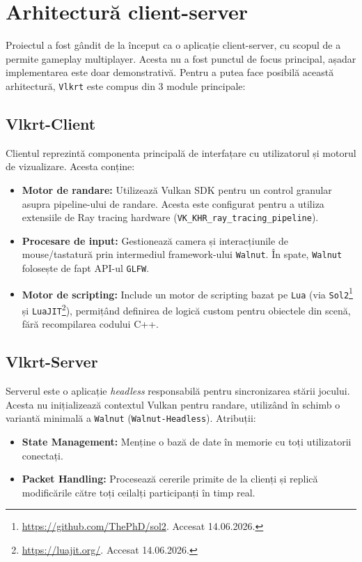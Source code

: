 \documentclass[12pt,a4paper]{report}
\numberwithin{equation}{section} %
\begin{document}
\section{Arhitectură client-server}

Proiectul a fost gândit de la început ca o aplicație client-server, cu scopul de a permite gameplay multiplayer.
Acesta nu a fost punctul de focus principal, așadar implementarea este doar demonstrativă.
Pentru a putea face posibilă această arhitectură, \texttt{Vlkrt} este compus din 3 module principale:

\subsection{Vlkrt-Client}

Clientul reprezintă componenta principală de interfațare cu utilizatorul și motorul de vizualizare.
Acesta conține:
\begin{itemize}
    \item \textbf{Motor de randare:} Utilizează Vulkan SDK pentru un control granular asupra pipeline-ului de randare.
        Acesta este configurat pentru a utiliza extensiile de Ray tracing hardware (\texttt{VK\_KHR\_ray\_tracing\_pipeline}).
    \item \textbf{Procesare de input:} Gestionează camera și interacțiunile de mouse/tastatură prin intermediul framework-ului \texttt{Walnut}.
        În spate, \texttt{Walnut} folosește de fapt API-ul \texttt{GLFW}.
    \item \textbf{Motor de scripting:} Include un motor de scripting bazat pe \texttt{Lua} (via \texttt{Sol2}\footnote{\url{https://github.com/ThePhD/sol2}. Accesat 14.06.2026.} și \texttt{LuaJIT}\footnote{\url{https://luajit.org/}. Accesat 14.06.2026.}), permițând definirea de logică custom pentru obiectele din scenă, fără recompilarea codului C++.
\end{itemize}

\subsection{Vlkrt-Server}

Serverul este o aplicație \textit{headless} responsabilă pentru sincronizarea stării jocului.
Acesta nu inițializează contextul Vulkan pentru randare, utilizând în schimb o variantă minimală a \texttt{Walnut} (\texttt{Walnut-Headless}).
Atribuții:
\begin{itemize}
    \item \textbf{State Management:} Menține o bază de date în memorie cu toți utilizatorii conectați.
    \item \textbf{Packet Handling:} Procesează cererile primite de la clienți și replică modificările către toți ceilalți participanți în timp real.
\end{itemize}
\end{document}

